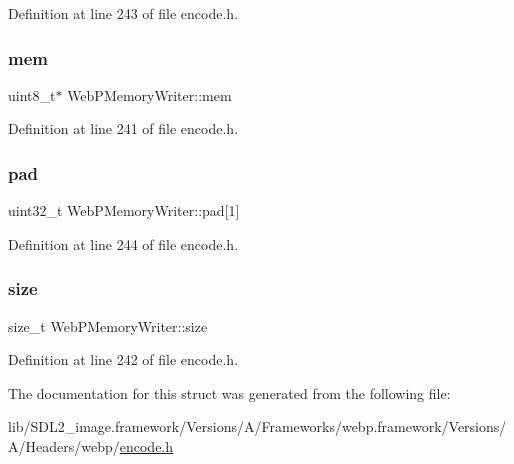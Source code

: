 Definition at line 243 of file encode.\+h.

\mbox{\label{struct_web_p_memory_writer_a8360c6b4913e19773104692a76e9bcf4}} 
\subsubsection{\texorpdfstring{mem}{mem}}
{\footnotesize\ttfamily uint8\+\_\+t$\ast$ Web\+P\+Memory\+Writer\+::mem}



Definition at line 241 of file encode.\+h.

\mbox{\label{struct_web_p_memory_writer_ae52a301440ed64ef97db833f0f5083d2}} 
\subsubsection{\texorpdfstring{pad}{pad}}
{\footnotesize\ttfamily uint32\+\_\+t Web\+P\+Memory\+Writer\+::pad\mbox{[}1\mbox{]}}



Definition at line 244 of file encode.\+h.

\mbox{\label{struct_web_p_memory_writer_abb6a286f7321da4b4abfbb7fa47945c3}} 
\subsubsection{\texorpdfstring{size}{size}}
{\footnotesize\ttfamily size\+\_\+t Web\+P\+Memory\+Writer\+::size}



Definition at line 242 of file encode.\+h.



The documentation for this struct was generated from the following file\+:\begin{DoxyCompactItemize}
\item 
lib/\+S\+D\+L2\+\_\+image.\+framework/\+Versions/\+A/\+Frameworks/webp.\+framework/\+Versions/\+A/\+Headers/webp/\mbox{\hyperlink{encode_8h}{encode.\+h}}\end{DoxyCompactItemize}
